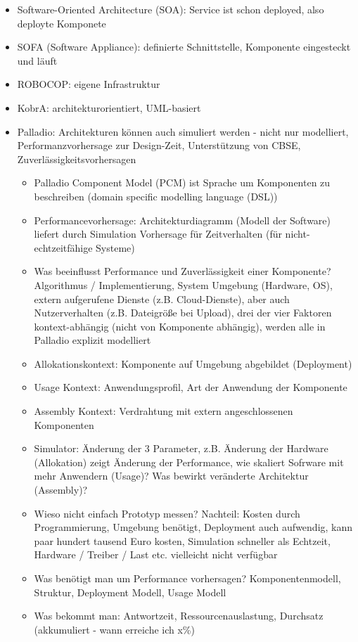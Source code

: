 \documentclass[paper=a4, fontsize=11pt]{scrartcl} %
\numberwithin{equation}{section} %
\numberwithin{figure}{section} %
\numberwithin{table}{section} %
\begin{document}
\begin{itemize}
\begin{itemize}
    \item Software-Oriented Architecture (SOA): Service ist schon deployed, also deployte Komponete
    \item SOFA (Software Appliance): definierte Schnittstelle, Komponente eingesteckt und läuft
    \item ROBOCOP: eigene Infrastruktur
    \item KobrA: architekturorientiert, UML-basiert
    \item Palladio: Architekturen können auch simuliert werden - nicht nur modelliert, Performanzvorhersage zur Design-Zeit, Unterstützung von CBSE, Zuverlässigkeitsvorhersagen
    \begin{itemize}
      \item Palladio Component Model (PCM) ist Sprache um Komponenten zu beschreiben (domain specific modelling language (DSL))
      \item Performancevorhersage: Architekturdiagramm (Modell der Software) liefert durch Simulation Vorhersage für Zeitverhalten (für nicht-echtzeitfähige Systeme)
      \item Was beeinflusst Performance und Zuverlässigkeit einer Komponente? Algorithmus / Implementierung, System Umgebung (Hardware, OS), extern aufgerufene Dienste (z.B. Cloud-Dienste), aber auch Nutzerverhalten (z.B. Dateigröße bei Upload), drei der vier Faktoren kontext-abhängig (nicht von Komponente abhängig), werden alle in Palladio explizit modelliert
      \item Allokationskontext: Komponente auf Umgebung abgebildet (Deployment)
      \item Usage Kontext: Anwendungsprofil, Art der Anwendung der Komponente
      \item Assembly Kontext: Verdrahtung mit extern angeschlossenen Komponenten
      \item Simulator: Änderung der 3 Parameter, z.B. Änderung der Hardware (Allokation) zeigt Änderung der Performance, wie skaliert Sofrware mit mehr Anwendern (Usage)? Was bewirkt veränderte Architektur (Assembly)?
      \item Wieso nicht einfach Prototyp messen? Nachteil: Kosten durch Programmierung, Umgebung benötigt, Deployment auch aufwendig, kann paar hundert tausend Euro kosten, Simulation schneller als Echtzeit, Hardware / Treiber / Last etc. vielleicht nicht verfügbar
      \item Was benötigt man um Performance vorhersagen? Komponentenmodell, Struktur, Deployment Modell, Usage Modell
      \item Was bekommt man: Antwortzeit, Ressourcenauslastung, Durchsatz (akkumuliert - wann erreiche ich x\%)

\end{itemize}
\end{itemize}
\end{itemize}
\end{document}
